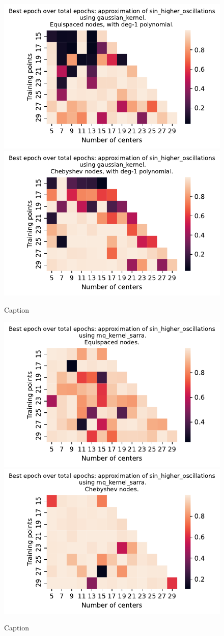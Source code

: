 \documentclass[12pt]{report} %
\begin{document}
\begin{figure}[ht]
  \centering

  \includegraphics[width=.49\textwidth]{imagenes/experiments/1d/variational_epochs/sin_higher_oscillations-Kgaussian_kernel-Poly-Equi-epochs.pdf}
  \includegraphics[width=.49\textwidth]{imagenes/experiments/1d/variational_epochs/sin_higher_oscillations-Kgaussian_kernel-Poly-Cheb-epochs.pdf}
  \caption{Caption}
  \label{fig:epochs-sin-higher-oscillations-gaussian-poly}
\end{figure}

\begin{figure}[ht]
  \centering

  \includegraphics[width=.49\textwidth]{imagenes/experiments/1d/variational_epochs/sin_higher_oscillations-Kmq_kernel_sarra-Equi-epochs.pdf}
  \includegraphics[width=.49\textwidth]{imagenes/experiments/1d/variational_epochs/sin_higher_oscillations-Kmq_kernel_sarra-Cheb-epochs.pdf}
  \caption{Caption}
  \label{fig:epochs-sin-higher-oscillations-sarra}
\end{figure}
\end{document}

